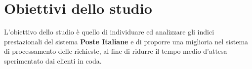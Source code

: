 \section{Obiettivi dello studio}
L'obiettivo dello studio è quello di individuare ed analizzare gli indici prestazionali del sistema \textbf{Poste Italiane} e di proporre una miglioria nel sistema di processamento delle richieste, al fine di ridurre il tempo medio d'attesa sperimentato dai clienti in coda.